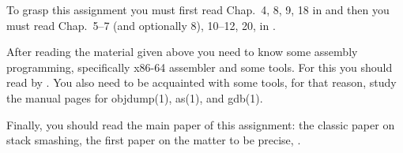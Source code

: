 To grasp this assignment you must first read
Chap.~4, 8, 9, 18 in  \cite{Anderson2008sea} and 
then you must read Chap.~5--7 (and optionally 8), 10--12, 20, in 
 \cite{Gollmann2011cs}.

After reading the material given above you need to know some assembly 
programming, specifically x86-64 assembler and some tools.
For this you should read  by \citet{assembly}.
You also need to be acquainted with some tools, for that reason, study the 
manual pages for objdump(1), as(1), and gdb(1).

Finally, you should read the main paper of this assignment: the classic paper 
on stack smashing, the first paper on the matter to be precise, 
 \cite{stacksmash}.
